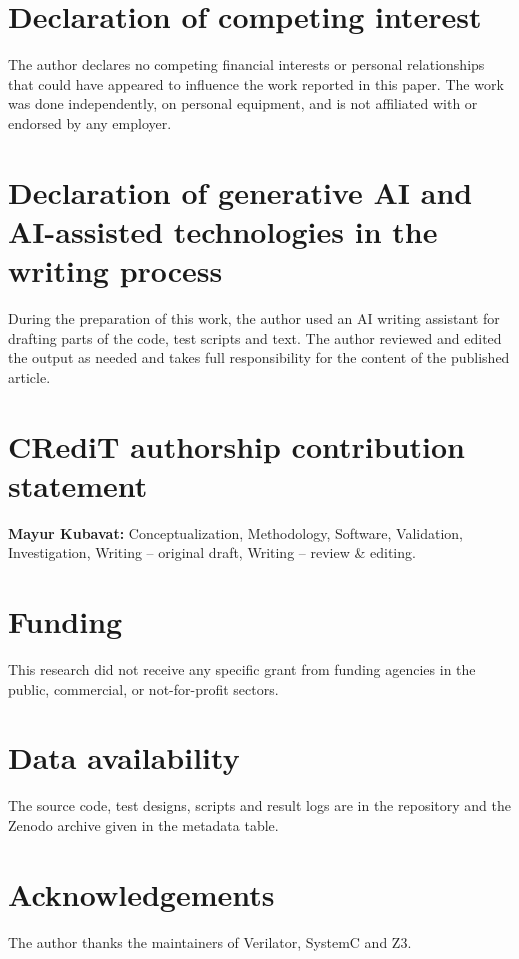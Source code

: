 \documentclass[preprint,12pt]{elsarticle}
\begin{document}
\section*{Declaration of competing interest}
The author declares no competing financial interests or personal relationships that could have
appeared to influence the work reported in this paper. The work was done independently, on
personal equipment, and is not affiliated with or endorsed by any employer.

\section*{Declaration of generative AI and AI-assisted technologies in the writing process}
During the preparation of this work, the author used an AI writing assistant for drafting parts of the
code, test scripts and text. The author reviewed and edited the output as needed and takes full
responsibility for the content of the published article.

\section*{CRediT authorship contribution statement}
\textbf{Mayur Kubavat:} Conceptualization, Methodology, Software, Validation, Investigation,
Writing -- original draft, Writing -- review \& editing.

\section*{Funding}
This research did not receive any specific grant from funding agencies in the public, commercial,
or not-for-profit sectors.

\section*{Data availability}
The source code, test designs, scripts and result logs are in the repository and the Zenodo
archive given in the metadata table.

\section*{Acknowledgements}
The author thanks the maintainers of Verilator, SystemC and Z3.



\end{document}
